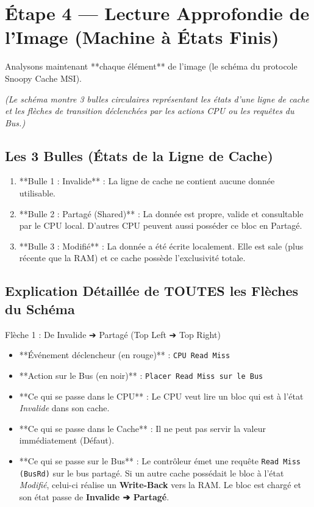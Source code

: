 \documentclass[12pt,a4paper]{article}
\begin{document}
\section{Étape 4 — Lecture Approfondie de l'Image (Machine à États Finis)}

Analysons maintenant **chaque élément** de l'image (le schéma du protocole Snoopy Cache MSI).

\begin{center}
\textit{(Le schéma montre 3 bulles circulaires représentant les états d'une ligne de cache et les flèches de transition déclenchées par les actions CPU ou les requêtes du Bus.)}
\end{center}

\subsection{Les 3 Bulles (États de la Ligne de Cache)}
\begin{enumerate}
    \item **Bulle 1 : Invalide** : La ligne de cache ne contient aucune donnée utilisable.
    \item **Bulle 2 : Partagé (Shared)** : La donnée est propre, valide et consultable par le CPU local. D'autres CPU peuvent aussi posséder ce bloc en Partagé.
    \item **Bulle 3 : Modifié** : La donnée a été écrite localement. Elle est sale (plus récente que la RAM) et ce cache possède l'exclusivité totale.
\end{enumerate}

\subsection{Explication Détaillée de TOUTES les Flèches du Schéma}

\begin{transitionbox}{Flèche 1 : De Invalide ➔ Partagé (Top Left ➔ Top Right)}
\begin{itemize}
    \item **Événement déclencheur (en rouge)** : \texttt{CPU Read Miss}
    \item **Action sur le Bus (en noir)** : \texttt{Placer Read Miss sur le Bus}
    \item **Ce qui se passe dans le CPU** : Le CPU veut lire un bloc qui est à l'état \textit{Invalide} dans son cache.
    \item **Ce qui se passe dans le Cache** : Il ne peut pas servir la valeur immédiatement (Défaut).
    \item **Ce qui se passe sur le Bus** : Le contrôleur émet une requête \texttt{Read Miss (BusRd)} sur le bus partagé. Si un autre cache possédait le bloc à l'état \textit{Modifié}, celui-ci réalise un \textbf{Write-Back} vers la RAM. Le bloc est chargé et son état passe de \textbf{Invalide ➔ Partagé}.
\end{itemize}
\end{transitionbox}
\end{document}
